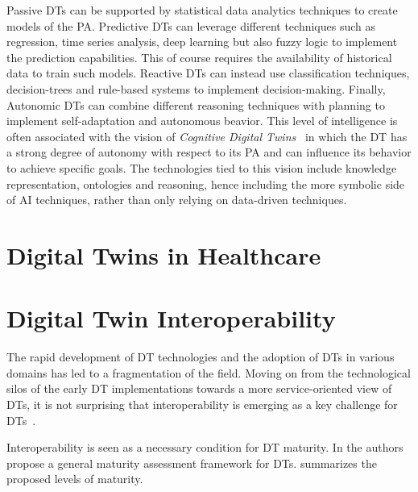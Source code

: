 Passive \acp{DT} can be supported by statistical data analytics techniques to create models of the \ac{PA}. 
%
Predictive \acp{DT} can leverage different techniques such as regression, time series analysis, deep learning but also fuzzy logic to implement the prediction capabilities. 
%
This of course requires the availability of historical data to train such models. 
%
Reactive \acp{DT} can instead use classification techniques, decision-trees and rule-based systems to implement decision-making. 
%
Finally, Autonomic \acp{DT} can combine different reasoning techniques with planning to implement self-adaptation and autonomous beavior.
%
This level of intelligence is often associated with the vision of \emph{Cognitive Digital Twins}~\cite{Zheng_Lu_Kiritsis_2022,Intizar_Ali_Patel_G_Breslin_Harik_Sheth_2021} in which the \ac{DT} has a strong degree of autonomy with respect to its \ac{PA} and can influence its behavior to achieve specific goals.
%
The technologies tied to this vision include knowledge representation, ontologies and reasoning, hence including the more symbolic side of \ac{AI} techniques, rather than only relying on data-driven techniques.

\section{Digital Twins in Healthcare}


\section{Digital Twin Interoperability}

The rapid development of \ac{DT} technologies and the adoption of \acp{DT} in various domains has led to a fragmentation of the field. 
%
Moving on from the technological silos of the early \ac{DT} implementations towards a more service-oriented view of \acp{DT},
it is not surprising that interoperability is emerging as a key challenge for \acp{DT}~\cite{piroumian2021interoperability,Rebelo_Moreira_2024}. 


Interoperability is seen as a necessary condition for \ac{DT} maturity.
In \cite{Klar_Arvidsson_Angelakis_2024} the authors propose a general maturity assessment framework for \acp{DT}. 
 summarizes the proposed levels of maturity.


